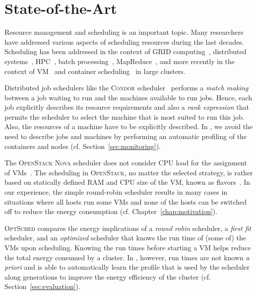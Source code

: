 
\chapter{State-of-the-Art}
\label{chap:soa}

Resource management and scheduling is an important topic.
Many researchers have addressed various aspects of scheduling resources during the last decades.
Scheduling has been addressed in the context of GRID computing~\cite{buyya2000nimrod}, distributed systems~\cite{tannenbaum2001condor}, HPC~\cite{Jackson2001}, batch processing~\cite{capit2005batch}, MapReduce~\cite{Yarn}, and more recently in the context of VM~\cite{litvinski2013openstack} and container scheduling~\cite{Burns:2016:BOK:2930840.2890784} in large clusters.

Distributed job schedulers like the \textsc{Condor} scheduler~\cite{tannenbaum2001condor} performs a \emph{match making} between a job waiting to run and the machines available to run jobs.
Hence, each job explicitly describes its resource requirements and also a \emph{rank expression} that permits the scheduler to select the machine that is most suited to run this job.
Also, the resources of a machine have to be explicitly described.
In \GP, we avoid the need to describe jobs and machines by performing an automatic profiling of the containers and nodes (cf. Section~\ref{sec:monitoring}).

The \textsc{OpenStack Nova} scheduler does not consider CPU load for the assignment of VMs~\cite{litvinski2013openstack}.
The scheduling in \textsc{OpenStack}, no matter the selected strategy, is rather based on statically defined RAM and CPU size of the VM, known as flavors~\cite{litvinski2013openstack}.
In our experience, the simple round-robin scheduler results in many cases in situations where all hosts run some VMs and none of the hosts can be switched off to reduce the energy consumption (cf. Chapter~\ref{chap:motivation}).

\textsc{OptSched}\cite{knauth2012energy} compares the energy implications of a \emph{round robin} scheduler, a \emph{first fit} scheduler, and an \emph{optimized} scheduler that knows the run time of (some of) the VMs upon scheduling.
Knowing the run times before starting a VM helps reduce the total energy consumed by a cluster.
In \GP, however, run times are not known \emph{a priori} and \GP is able to automatically learn the profile that is used by the scheduler along generations to improve the energy efficiency of the cluster (cf. Section~\ref{sec:evaluation}).

